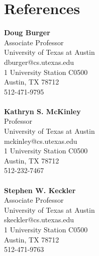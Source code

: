 \documentclass[11pt]{article}
\begin{document}

\section{References}
\begin{multicols}{3}
\noindent 
\textbf{Doug Burger} \\
Associate Professor \\
University of Texas at Austin \\
dburger@cs.utexas.edu \\
1 University Station C0500 \\
Austin, TX 78712 \\
512-471-9795\\
\\
\textbf{Kathryn S. McKinley} \\
Professor\\
University of Texas at Austin \\
mckinley@cs.utexas.edu \\
1 University Station C0500 \\
Austin, TX 78712 \\
512-232-7467 \\
\\
\textbf{Stephen W. Keckler} \\
Associate Professor \\
University of Texas at Austin \\
skeckler@cs.utexas.edu \\
1 University Station C0500 \\
Austin, TX 78712 \\
512-471-9763
\end{multicols}
\end{document}
